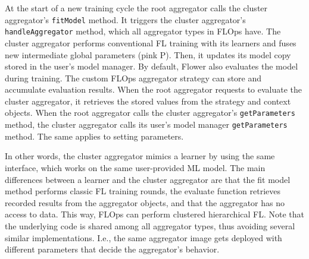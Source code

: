 At the start of a new training cycle the root aggregator calls the cluster aggregator's \texttt{fitModel} method.
It triggers the cluster aggregator's \texttt{handleAggregator} method, which all aggregator types in FLOps have.
The cluster aggregator performs conventional FL training with its learners and fuses new intermediate global parameters (pink P).
Then, it updates its model copy stored in the user's model manager.
By default, Flower also evaluates the model during training.
The custom FLOps aggregator strategy can store and accumulate evaluation results.
When the root aggregator requests to evaluate the cluster aggregator, it retrieves the stored values from the strategy and context objects.
When the root aggregator calls the cluster aggregator's \texttt{getParameters} method, the cluster aggregator calls its user's model manager \texttt{getParameters} method.
The same applies to setting parameters.

In other words, the cluster aggregator mimics a learner by using the same interface, which works on the same user-provided ML model.
The main differences between a learner and the cluster aggregator are that the fit model method performs classic FL training rounds, the evaluate function retrieves recorded results from the aggregator objects, and that the aggregator has no access to data.
This way, FLOps can perform clustered hierarchical FL.
Note that the underlying code is shared among all aggregator types, thus avoiding several similar implementations.
I.e., the same aggregator image gets deployed with different parameters that decide the aggregator's behavior.
